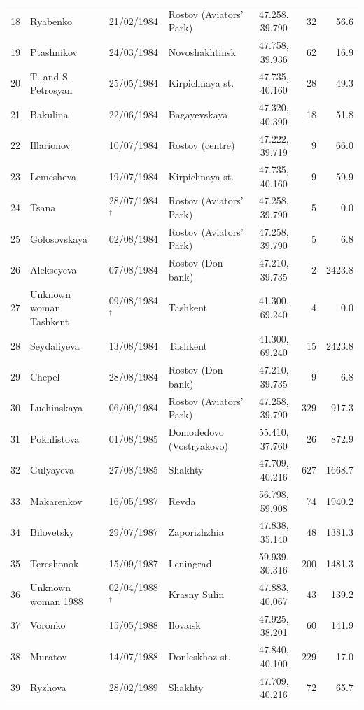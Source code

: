 \documentclass[11pt,a4paper]{article}
\begin{document}
{\begin{longtable}{rllp{3.6cm}crr}
18 & Ryabenko & 21/02/1984 & Rostov (Aviators' Park) & 47.258, 39.790 & 32 & 56.6\\
19 & Ptashnikov & 24/03/1984 & Novoshakhtinsk & 47.758, 39.936 & 62 & 16.9\\
20 & T. and S. Petrosyan & 25/05/1984 & Kirpichnaya st. & 47.735, 40.160 & 28 & 49.3\\
21 & Bakulina & 22/06/1984 & Bagayevskaya & 47.320, 40.390 & 18 & 51.8\\
22 & Illarionov & 10/07/1984 & Rostov (centre) & 47.222, 39.719 & 9 & 66.0\\
23 & Lemesheva & 19/07/1984 & Kirpichnaya st. & 47.735, 40.160 & 9 & 59.9\\
24 & Tsana & 28/07/1984$^\dagger$ & Rostov (Aviators' Park) & 47.258, 39.790 & 5 & 0.0\\
25 & Golosovskaya & 02/08/1984 & Rostov (Aviators' Park) & 47.258, 39.790 & 5 & 6.8\\
26 & Alekseyeva & 07/08/1984 & Rostov (Don bank) & 47.210, 39.735 & 2 & 2423.8\\
27 & Unknown woman Tashkent & 09/08/1984$^\dagger$ & Tashkent & 41.300, 69.240 & 4 & 0.0\\
28 & Seydaliyeva & 13/08/1984 & Tashkent & 41.300, 69.240 & 15 & 2423.8\\
29 & Chepel & 28/08/1984 & Rostov (Don bank) & 47.210, 39.735 & 9 & 6.8\\
30 & Luchinskaya & 06/09/1984 & Rostov (Aviators' Park) & 47.258, 39.790 & 329 & 917.3\\
31 & Pokhlistova & 01/08/1985 & Domodedovo (Vostryakovo) & 55.410, 37.760 & 26 & 872.9\\
32 & Gulyayeva & 27/08/1985 & Shakhty & 47.709, 40.216 & 627 & 1668.7\\
33 & Makarenkov & 16/05/1987 & Revda & 56.798, 59.908 & 74 & 1940.2\\
34 & Bilovetsky & 29/07/1987 & Zaporizhzhia & 47.838, 35.140 & 48 & 1381.3\\
35 & Tereshonok & 15/09/1987 & Leningrad & 59.939, 30.316 & 200 & 1481.3\\
36 & Unknown woman 1988 & 02/04/1988$^\dagger$ & Krasny Sulin & 47.883, 40.067 & 43 & 139.2\\
37 & Voronko & 15/05/1988 & Ilovaisk & 47.925, 38.201 & 60 & 141.9\\
38 & Muratov & 14/07/1988 & Donleskhoz st. & 47.840, 40.100 & 229 & 17.0\\
39 & Ryzhova & 28/02/1989 & Shakhty & 47.709, 40.216 & 72 & 65.7\\

\end{longtable}}
\end{document}
